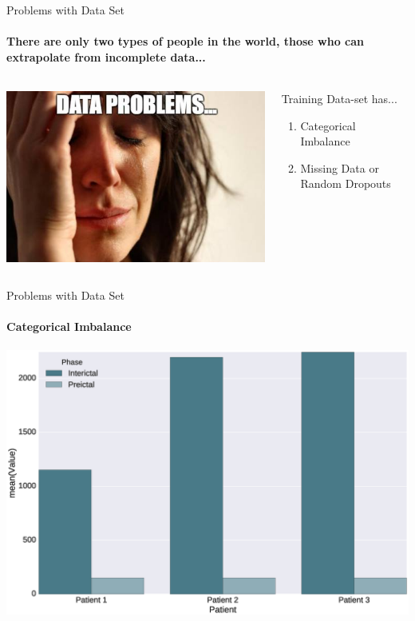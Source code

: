 \documentclass{beamer}
\begin{document}
\begin{frame}{Problems with Data Set}
  \framesubtitle{There are only two types of people in the world, those who can
    extrapolate from incomplete data...}

  \begin{columns}
    
      \includegraphics[scale=0.35]{img/data_problems.png}


    \begin{block}{Training Data-set has...}
      \begin{enumerate}
      \item Categorical Imbalance
      \item Missing Data or Random Dropouts
      \end{enumerate}
    \end{block}

  \end{columns}
  
\end{frame}

\begin{frame}{Problems with Data Set}
  \framesubtitle{Categorical Imbalance}

  \begin{center}
    \includegraphics[scale=0.28]{img/cat_imbalance.eps}
  \end{center}
\end{frame}
\end{document}
